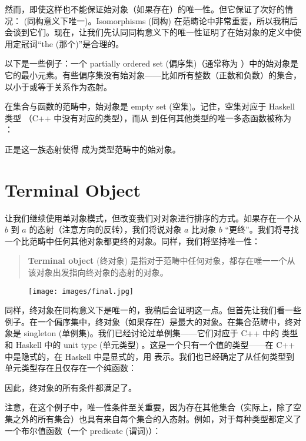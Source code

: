 \noindent
然而，即使这样也不能保证始对象（如果存在）的唯一性。但它保证了次好的情况： (同构意义下唯一)。Isomorphisms (同构) 在范畴论中非常重要，所以我稍后会谈到它们。现在，让我们先认同同构意义下的唯一性证明了在始对象的定义中使用定冠词“the (那个)”是合理的。

以下是一些例子：一个 partially ordered set (偏序集)（通常称为 ）中的始对象是它的最小元素。有些偏序集没有始对象——比如所有整数（正数和负数）的集合，以小于或等于关系作为态射。

在集合与函数的范畴中，始对象是 empty set (空集)。记住，空集对应于 Haskell 类型 （C++ 中没有对应的类型），而从  到任何其他类型的唯一多态函数被称为 ：

正是这一族态射使得  成为类型范畴中的始对象。

\section{Terminal Object}

让我们继续使用单对象模式，但改变我们对对象进行排序的方式。如果存在一个从 $b$ 到 $a$ 的态射（注意方向的反转），我们将说对象 $a$ 比对象 $b$ “更终”。我们将寻找一个比范畴中任何其他对象都更终的对象。同样，我们将坚持唯一性：

\begin{quote}
  \textbf{Terminal object} (终对象) 是指对于范畴中任何对象，都存在唯一一个从该对象出发指向终对象的态射的对象。
\end{quote}

\begin{figure}[H]
  \centering
  \texttt{[image: images/final.jpg]}
\end{figure}

\noindent
同样，终对象在同构意义下是唯一的，我稍后会证明这一点。但首先让我们看一些例子。在一个偏序集中，终对象（如果存在）是最大的对象。在集合范畴中，终对象是 singleton (单例集)。我们已经讨论过单例集——它们对应于 C++ 中的  类型和 Haskell 中的 unit type (单元类型) \code{()}。这是一个只有一个值的类型——在 C++ 中是隐式的，在 Haskell 中是显式的，用 \code{()} 表示。我们也已经确定了从任何类型到单元类型存在且仅存在一个纯函数：

因此，终对象的所有条件都满足了。

注意，在这个例子中，唯一性条件至关重要，因为存在其他集合（实际上，除了空集之外的所有集合）也具有来自每个集合的入态射。例如，对于每种类型都定义了一个布尔值函数（一个 predicate (谓词)）：

